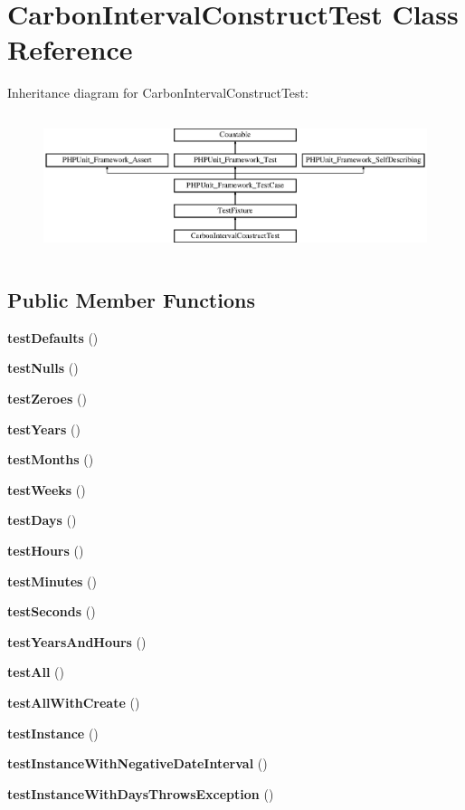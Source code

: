 \section{Carbon\+Interval\+Construct\+Test Class Reference}
\label{class_carbon_interval_construct_test}
Inheritance diagram for Carbon\+Interval\+Construct\+Test\+:\begin{figure}[H]
\begin{center}
\leavevmode
\includegraphics[height=4.129793cm]{class_carbon_interval_construct_test}
\end{center}
\end{figure}
\subsection*{Public Member Functions}
\begin{DoxyCompactItemize}
\item 
{\bf test\+Defaults} ()
\item 
{\bf test\+Nulls} ()
\item 
{\bf test\+Zeroes} ()
\item 
{\bf test\+Years} ()
\item 
{\bf test\+Months} ()
\item 
{\bf test\+Weeks} ()
\item 
{\bf test\+Days} ()
\item 
{\bf test\+Hours} ()
\item 
{\bf test\+Minutes} ()
\item 
{\bf test\+Seconds} ()
\item 
{\bf test\+Years\+And\+Hours} ()
\item 
{\bf test\+All} ()
\item 
{\bf test\+All\+With\+Create} ()
\item 
{\bf test\+Instance} ()
\item 
{\bf test\+Instance\+With\+Negative\+Date\+Interval} ()
\item 
{\bf test\+Instance\+With\+Days\+Throws\+Exception} ()
\end{DoxyCompactItemize}
